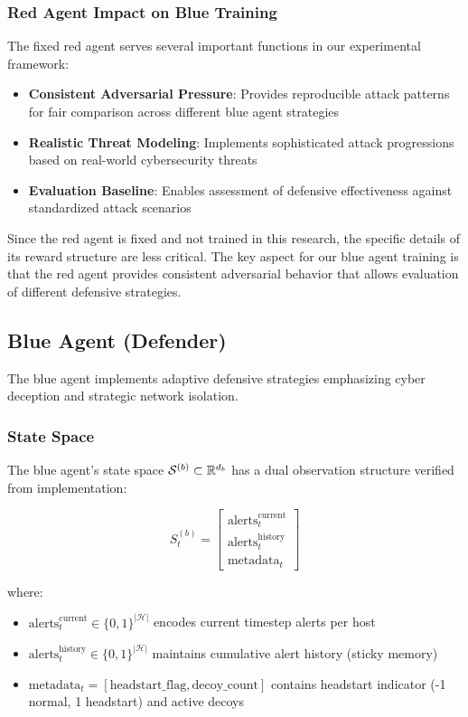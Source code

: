 \documentclass[12pt,twoside]{article}
\theoremstyle{definition}
\theoremstyle{plain}
\begin{document}
\subsubsection{Red Agent Impact on Blue Training}
The fixed red agent serves several important functions in our experimental framework:
\begin{itemize}
\item \textbf{Consistent Adversarial Pressure}: Provides reproducible attack patterns for fair comparison across different blue agent strategies
\item \textbf{Realistic Threat Modeling}: Implements sophisticated attack progressions based on real-world cybersecurity threats
\item \textbf{Evaluation Baseline}: Enables assessment of defensive effectiveness against standardized attack scenarios
\end{itemize}

Since the red agent is fixed and not trained in this research, the specific details of its reward structure are less critical. The key aspect for our blue agent training is that the red agent provides consistent adversarial behavior that allows evaluation of different defensive strategies.

\subsection{Blue Agent (Defender)}

The blue agent implements adaptive defensive strategies emphasizing cyber deception and strategic network isolation.

\subsubsection{State Space}
The blue agent's state space $\mathcal{S}^{(b)} \subset \mathbb{R}^{d_b}$ has a dual observation structure verified from implementation:

\begin{equation}
S_t^{(b)} = \begin{bmatrix}
\text{alerts}_t^{\text{current}} \\
\text{alerts}_t^{\text{history}} \\
\text{metadata}_t
\end{bmatrix}
\end{equation}

where:
\begin{itemize}
    \item $\text{alerts}_{t}^{\text{current}} \in \{0,1\}^{|\mathcal{H}|}$ encodes current timestep alerts per host
    \item $\text{alerts}_{t}^{\text{history}} \in \{0,1\}^{|\mathcal{H}|}$ maintains cumulative alert history (sticky memory)
    \item $\text{metadata}_t = [\text{headstart\_flag}, \text{decoy\_count}]$ contains headstart indicator (-1 normal, 1 headstart) and active decoys
\end{itemize}
\end{document}
